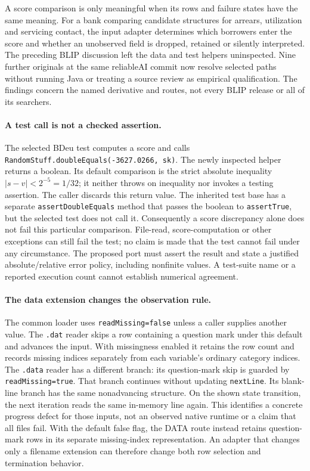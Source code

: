 A score comparison is only meaningful when its rows and failure states have the same meaning.
For a bank comparing candidate structures for arrears, utilization and servicing contact,
the input adapter determines which borrowers enter the score and whether an unobserved
field is dropped, retained or silently interpreted. The preceding BLIP discussion left
the data and test helpers uninspected. Nine further originals at the same reliableAI
commit now resolve selected paths without running Java or treating a source review as
empirical qualification. The findings concern the named derivative and routes, not every
BLIP release or all of its searchers.~\citep{exec28_blip_helpers}

\paragraph{A test call is not a checked assertion.}
The selected BDeu test computes a score and calls
\texttt{RandomStuff.doubleEquals(-3627.0266, sk)}. The newly inspected helper returns a
boolean. Its default comparison is the strict absolute inequality
\( |s-v|<2^{-5}=1/32 \); it neither throws on inequality nor invokes a testing assertion.
The caller discards this return value. The inherited test base has a separate
\texttt{assertDoubleEquals} method that passes the boolean to \texttt{assertTrue}, but
the selected test does not call it. Consequently a score discrepancy alone does not
fail this particular comparison. File-read, score-computation or other exceptions can
still fail the test; no claim is made that the test cannot fail under any circumstance.
The proposed port must assert the result and state a justified absolute/relative error
policy, including nonfinite values. A test-suite name or a reported execution count
cannot establish numerical agreement.~\citep{exec28_blip_helpers}

\paragraph{The data extension changes the observation rule.}
The common loader uses \texttt{readMissing=false} unless a caller supplies another
value. The \texttt{.dat} reader skips a row containing a question mark under this
default and advances the input. With missingness enabled it retains the row count and
records missing indices separately from each variable's ordinary category indices.
The \texttt{.data} reader has a different branch: its question-mark skip is guarded
by \texttt{readMissing=true}. That branch continues without updating
\texttt{nextLine}. Its blank-line branch has the same nonadvancing structure. On the
shown state transition, the next iteration reads the same in-memory line again.
This identifies a concrete progress defect for those inputs, not an observed native
runtime or a claim that all files fail. With the default false flag, the DATA route
instead retains question-mark rows in its separate missing-index representation.
An adapter that changes only a filename extension can therefore change both row
selection and termination behavior.~\citep{exec28_blip_helpers}

